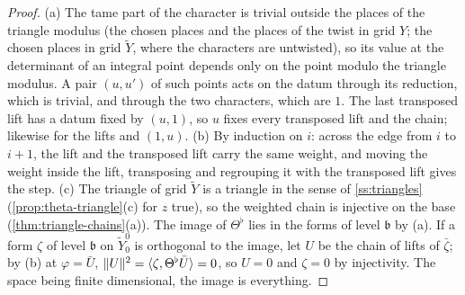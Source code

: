 \begin{proof}
(a) The tame part of the character is trivial outside the places of the triangle modulus (the chosen places and the places of the twist in grid $Y$; the chosen places in grid $\tilde Y$, where the characters are
untwisted), so its value at the determinant of an integral point depends only on the point modulo the triangle modulus. A pair $(u,u')$ of such points acts on the datum through its reduction, which is trivial, and
through the two characters, which are $1$. The last transposed lift has a datum fixed by $(u,1)$, so $u$ fixes every transposed lift and the chain; likewise for the lifts and $(1,u)$. (b) By induction on $i$: across the edge
from $i$ to $i+1$, the lift and the transposed lift carry the same weight, and moving the weight inside the lift, transposing and regrouping it with the transposed lift gives the step. (c) The triangle of grid $\tilde Y$ is a
triangle in the sense of \cref{ss:triangles} (\cref{prop:theta-triangle}(c) for $z$ true), so the weighted chain is injective on the base (\cref{thm:triangle-chains}(a)). The image of $\Theta^\flat$ lies in the forms of level $\mathfrak b$
by (a). If a form $\zeta$ of level $\mathfrak b$ on $\tilde Y^0_0$ is orthogonal to the image, let $U$ be the chain of lifts of $\bar\zeta$; by (b) at $\varphi=\bar U$, $\lVert U\rVert^2=\langle\zeta,\Theta^\flat\bar U\rangle=0$, so $U=0$ and $\zeta=0$ by
injectivity. The space being finite dimensional, the image is everything.
\end{proof}

